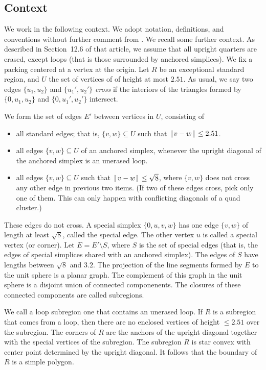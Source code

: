 \documentclass[11pt]{amsart}
\def\|{{\hskip0.1em|\hskip-0.15em|\hskip0.1em}}
\let\subset=\subseteq
\begin{document}
\subsection*{Context}

We work in the following context.  We adopt notation, definitions, and conventions without further comment
from \cite{Hales:2006:DCG}.  We recall some further context.
As described in Section~12.6 of that article, we assume that all upright quarters
are erased, except loops (that is those surrounded by anchored simplices).  We fix a packing centered at a vertex at the origin.  Let $R$ be an exceptional standard region, and
$U$ the set of vertices of of height at most $2.51$.  As usual, we say two edges $\{u_1,u_2\}$ and $\{u_1',u_2'\}$ {\it cross}
if the interiors of the triangles formed by $\{0,u_1,u_2\}$ and $\{0,u_1',u_2'\}$ intersect.

We form the set of edges $E'$ between vertices in $U$, consisting of
\begin{itemize}
\item all standard edges; that is, $\{v,w\}\subset U$ such that $\|v-w\|\le 2.51$.
\item all edges $\{v,w\}\subset U$ of an anchored simplex, whenever the upright diagonal of the anchored simplex is an unerased loop.
\item all edges $\{v,w\}\subset U$ such that $\|v-w\|\le\sqrt8$, where $\{v,w\}$ does not cross any other edge in previous two items.  (If two of these edges cross, pick only one of them. This can only happen with conflicting diagonals
of a quad cluster.)
\end{itemize}
These edges do not cross.  A special simplex $\{0,u,v,w\}$ has one edge $\{v,w\}$ of length at least $\sqrt8$,
called the special edge.  The other vertex $u$ is called a special vertex (or corner).
Let $E=E'\setminus S$, where $S$ is the set of special edges (that
is, the edges of special simplices shared with an anchored simplex).
The edges of $S$ have lengths between $\sqrt8$ and $3.2$.
 The projection of the line segments formed by $E$ to the
unit sphere is a planar graph.
The complement of this graph in the unit sphere
is a disjoint union of connected componenents.  The closures of these connected components are called subregions.

We call a loop subregion one that contains an unerased loop.
If $R$ is a subregion that comes from a loop, then there are no enclosed vertices of height $\le 2.51$ over the
subregion.  The corners of $R$ are the anchors of the upright diagonal together with the special vertices
of the subregion.  The subregion $R$ is star convex with center point determined by the upright diagonal.
It follows that the boundary of $R$ is a simple polygon.
\end{document}
